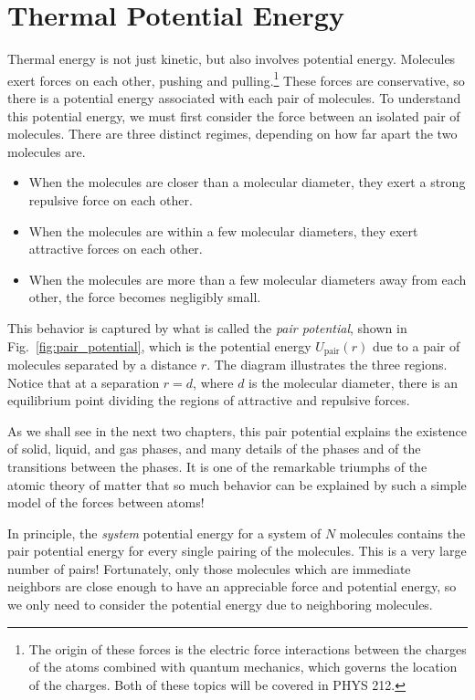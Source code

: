 \section{Thermal Potential Energy}

\label{section:thermal_potential_energy}

Thermal energy is not just kinetic, but also involves potential
energy.  Mole\-cules exert forces on each other, pushing and
pulling.\footnote{The origin of these forces is the electric force
  interactions between the charges of the atoms combined with quantum
  mechanics, which governs the location of the charges.  Both of these
  topics will be covered in PHYS 212.}  These forces are conservative,
so there is a potential energy associated with each pair of molecules.
To understand this potential energy, we must first consider the force
between an isolated pair of molecules.  There are three distinct
regimes, depending on how far apart the two molecules are.
\begin{itemize}
\item When the molecules are closer than a molecular diameter, they
exert a strong repulsive force on each other.
\item When the molecules are within a few molecular diameters, they
exert attractive forces on each other.
\item When the molecules are more than a few molecular diameters away
from each other, the force becomes negligibly small.
\end{itemize}

This behavior is captured by what is called the {\it pair
  potential\/}, shown in Fig.~\ref{fig:pair_potential}, which is the
potential energy $U_\text{pair}(r)$ due to a pair of molecules
separated by a distance $r$.  The diagram illustrates the three
regions.  Notice that at a separation $r=d$, where $d$ is the
molecular diameter, there is an equilibrium point dividing the regions
of attractive and repulsive forces.

As we shall see in the next two chapters, this pair potential explains
the existence of solid, liquid, and gas phases, and many details of
the phases and of the transitions between the phases.  It is one of
the remarkable triumphs of the atomic theory of matter that so much
behavior can be explained by such a simple model of the forces between
atoms!

In principle, the {\it system} potential energy for a system of $N$
molecules contains the pair potential energy for every single pairing
of the molecules.  This is a very large number of pairs!  Fortunately,
only those molecules which are immediate neighbors are close enough to
have an appreciable force and potential energy, so we only need to
consider the potential energy due to neighboring molecules.

